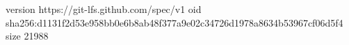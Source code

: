 version https://git-lfs.github.com/spec/v1
oid sha256:d1131f2d53e958bb0e6b8ab48f377a9e02c34726d1978a8634b53967cf06d5f4
size 21988
